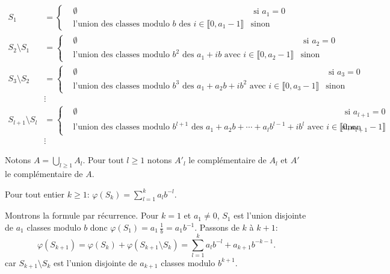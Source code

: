 \begin{align*}
 S_1 &= \left\lbrace
   \begin{aligned}
   & \emptyset &\text{ si } a_1 = 0 \\
   &\text{l'union des classes modulo } b \text{ des } i \in \llbracket 0, a_1-1\rrbracket &\text{sinon}
   \end{aligned}
   \right. \\
 S_2 \setminus S_1 &= \left\lbrace
   \begin{aligned}
   & \emptyset &\text{ si } a_2 = 0 \\
   &\text{l'union des classes modulo } b^2 \text{ des } a_1 + ib \text{ avec }i \in \llbracket 0, a_2-1\rrbracket &\text{sinon}
   \end{aligned}
   \right. \\
 S_3 \setminus S_2 &= \left\lbrace
   \begin{aligned}
   & \emptyset &\text{ si } a_3 = 0 \\
   &\text{l'union des classes modulo } b^3 \text{ des } a_1 + a_2b + ib^2 \text{ avec }i \in \llbracket 0, a_3-1\rrbracket &\text{sinon}
   \end{aligned}
   \right. \\
   & \vdots \\
 S_{l+1} \setminus S_l &= \left\lbrace
   \begin{aligned}
   & \emptyset &\text{ si } a_{l+1} = 0 \\
   &\text{l'union des classes modulo } b^{l+1} \text{ des } a_1 + a_2b + \cdots + a_lb^{l-1} + ib^{l} \text{ avec }i \in \llbracket 0, a_{l+1}-1\rrbracket &\text{sinon}
   \end{aligned}
   \right. \\
   & \vdots
\end{align*}
\begin{defi}
 Notons $A = \bigcup_{l\geq 1}A_l$.\newline
 Pour tout $l\geq 1$ notons $A'_l$ le complémentaire de $A_l$ et $A'$ le complémentaire de $A$.
\end{defi}
\begin{prop}
 Pour tout entier $k\geq 1$:
 \begin{math}
  \varphi(S_k)= \sum_{l=1}^k a_l b^{-l}.
 \end{math}
\end{prop}
\begin{demo}
Montrons la formule par récurrence.\newline
 Pour $k=1$ et $a_1 \neq 0$, $S_1$ est l'union disjointe de $a_1$ classes modulo $b$ donc $\varphi(S_1)= a_1\, \frac{1}{b} = a_1 b^{-1}$.\newline
Passons de $k$ à $k+1$:
\begin{displaymath}
 \varphi(S_{k+1}) = \varphi(S_k) + \varphi(S_{k+1} \setminus S_k)
 = \sum_{l=1}^k a_l b^{-l} + a_{k+1}b^{-k-1}.
\end{displaymath}
car $S_{k+1} \setminus S_k$ est l'union disjointe de $a_{k+1}$ classes modulo $b^{k+1}$.
\end{demo}
